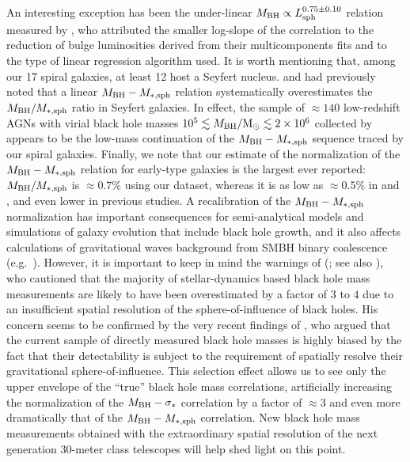 An interesting exception has been the under-linear $M_{\rm BH} \propto L_{\rm sph}^{0.75 \pm 0.10}$ relation 
measured by \citet{lasker2014anal}, 
who attributed the smaller log-slope of the correlation 
to the reduction of bulge luminosities derived from their multicomponents fits 
and to the type of linear regression algorithm used. 
It is worth mentioning that, among our 17 spiral galaxies, at least 12 host a Seyfert nucleus. 
\citet{wandel1999} and \citet{ryan2007} had previously noted that a linear $M_{\rm BH} - M_{\rm *,sph}$ relation 
systematically overestimates the $M_{\rm BH}/M_{\rm *,sph}$ ratio in Seyfert galaxies. 
In effect, the sample of $\approx 140$ low-redshift AGNs with virial black hole masses 
$10^5 \lesssim M_{\rm BH}/{\rm M_\odot} \lesssim 2 \times 10^6$ collected by \citet{grahamscott2015} 
appears to be the low-mass continuation of the $M_{\rm BH} - M_{\rm *,sph}$ sequence traced by our spiral galaxies. 
Finally, we note that our estimate of the normalization of the $M_{\rm BH} - M_{\rm *,sph}$ relation for early-type galaxies 
is the largest ever reported: $M_{\rm BH}/M_{\rm *,sph}$ is $\approx 0.7\%$ using our dataset, 
whereas it is as low as $\approx 0.5\%$ in \citet{scott2013} and \citet{kormendyho2013}, 
and even lower in previous studies. 
A recalibration of the $M_{\rm BH} - M_{\rm *,sph}$ normalization has important consequences 
for semi-analytical models and simulations of galaxy evolution that include black hole growth, 
and it also affects calculations of gravitational waves background from SMBH binary coalescence 
(e.g.~\citealt{shannon2015,shankar2016}). 
However, it is important to keep in mind the warnings of \citeauthor{merritt2013book} 
(\citeyear{merritt2013book}; see also \citealt{ferraresemerritt2000,merrittferrarese2001ms,merrittferrarese2001sphinfl,
valluri2004,ferrareseford2005}), 
who cautioned that the majority of stellar-dynamics based black hole mass measurements 
are likely to have been overestimated by a factor of $3$ to $4$ 
due to an insufficient spatial resolution of the sphere-of-influence of black holes. 
His concern seems to be confirmed by the very recent findings of \citet{shankar2016}, 
who argued that the current sample of directly measured black hole masses 
is highly biased by the fact that their detectability 
is subject to the requirement of spatially resolve their gravitational sphere-of-influence. 
This selection effect allows us to see only the upper envelope of the ``true'' black hole mass correlations, 
artificially increasing the normalization of the $M_{\rm BH} - \sigma_*$ correlation by a factor of $\approx 3$ 
and even more dramatically that of the $M_{\rm BH} - M_{\rm *,sph}$ correlation. 
New black hole mass measurements obtained with the extraordinary spatial resolution of the next generation 
30-meter class telescopes will help shed light on this point.  \\

